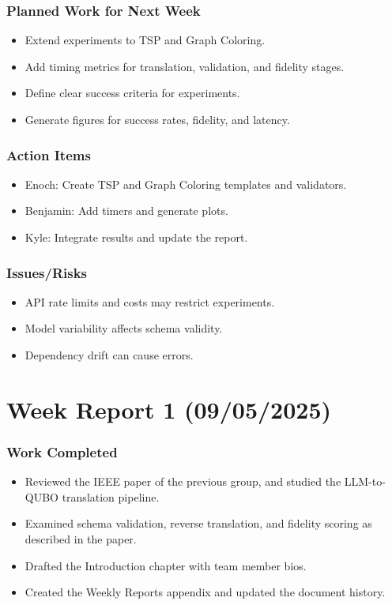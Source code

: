 \subsubsection{Planned Work for Next Week}
\begin{itemize}
  \item Extend experiments to TSP and Graph Coloring. 
  \item Add timing metrics for translation, validation, and fidelity stages. 
  \item Define clear success criteria for experiments. 
  \item Generate figures for success rates, fidelity, and latency. 
\end{itemize}

\subsubsection{Action Items}
\begin{itemize}
  \item Enoch: Create TSP and Graph Coloring templates and validators. 
  \item Benjamin: Add timers and generate plots. 
  \item Kyle: Integrate results and update the report. 
\end{itemize}

\subsubsection{Issues/Risks}
\begin{itemize}
  \item API rate limits and costs may restrict experiments. 
  \item Model variability affects schema validity. 
  \item Dependency drift can cause errors. 
\end{itemize}

\section{Week Report 1 (09/05/2025)}

\subsubsection{Work Completed}
\begin{itemize}
  \item Reviewed the IEEE paper of the previous group, \cite{sato2025trustworthy} and studied the LLM-to-QUBO translation pipeline. 
  \item Examined schema validation, reverse translation, and fidelity scoring as described in the paper. 
  \item Drafted the Introduction chapter with team member bios. 
  \item Created the Weekly Reports appendix and updated the document history. 
\end{itemize}

